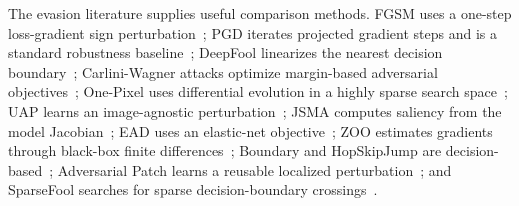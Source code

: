 \documentclass[conference]{IEEEtran}
\begin{document}
The evasion literature supplies useful comparison methods. FGSM uses a one-step loss-gradient sign perturbation~\cite{goodfellow2014}; PGD iterates projected gradient steps and is a standard robustness baseline~\cite{madry2017}; DeepFool linearizes the nearest decision boundary~\cite{deepfool}; Carlini-Wagner attacks optimize margin-based adversarial objectives~\cite{cw}; One-Pixel uses differential evolution in a highly sparse search space~\cite{onepixel}; UAP learns an image-agnostic perturbation~\cite{uap}; JSMA computes saliency from the model Jacobian~\cite{jsma}; EAD uses an elastic-net objective~\cite{ead}; ZOO estimates gradients through black-box finite differences~\cite{zoo}; Boundary and HopSkipJump are decision-based~\cite{boundaryattack,hopskipjump}; Adversarial Patch learns a reusable localized perturbation~\cite{adversarialpatch}; and SparseFool searches for sparse decision-boundary crossings~\cite{sparsefool}.
\end{document}

